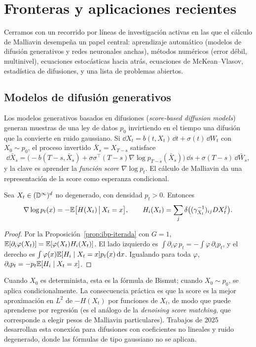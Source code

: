 \chapter{Fronteras y aplicaciones recientes}\label{cap:fronteras}

\begin{panorama}
Cerramos con un recorrido por líneas de investigación activas en las que el cálculo de
Malliavin desempeña un papel central: aprendizaje automático (modelos de difusión
generativos y redes neuronales anchas), métodos numéricos (error débil, multinivel), ecuaciones
estocásticas hacia atrás, ecuaciones de McKean--Vlasov, estadística de difusiones, y
una lista de problemas abiertos.
\end{panorama}

\section{Modelos de difusión generativos}
Los modelos generativos basados en difusiones (\emph{score-based diffusion models}) generan muestras
de una ley de datos $p_0$ invirtiendo en el tiempo una difusión que la convierte en ruido gaussiano.
Si $\dd X_t=b(t,X_t)\,\dd t+\sigma(t)\,\dd W_t$ con $X_0\sim p_0$, el proceso invertido $\bar X_s=X_{T-s}$ satisface
\[
  \dd\bar X_s=\big(-b(T-s,\bar X_s)+\sigma\sigma^\top(T-s)\nabla\log p_{T-s}(\bar X_s)\big)\,\dd s+\sigma(T-s)\,\dd\bar W_s,
\]
y la clave es aprender la \emph{función score} $\nabla\log p_t$. El cálculo de Malliavin da una representación
de la score como esperanza condicional.

\begin{proposicion}
Sea $X_t\in(\mathbb{D}^\infty)^d$ no degenerado, con
densidad $p_t>0$. Entonces
\[
  \nabla\log p_t(x)=-\mathbb{E}\big[H(X_t)\,\big|\,X_t=x\big],\qquad H_i(X_t)=\sum_j\delta\big((\gamma_{X_t}^{-1})_{ij}DX^j_t\big).
\]
\end{proposicion}

\begin{proof}
Por la Proposición~\ref{prop:ibp-iterada} con $G=1$, $\mathbb{E}[\partial_i\varphi(X_t)]=\mathbb{E}[\varphi(X_t)H_i(X_t)]$. El lado
izquierdo es $\int\partial_i\varphi\,p_t=-\int\varphi\,\partial_ip_t$, y el derecho es $\int\varphi(x)\mathbb{E}[H_i\mid X_t=x]p_t(x)\,\mathrm{d} x$. Igualando para
toda $\varphi$, $\partial_ip_t=-p_t\mathbb{E}[H_i\mid X_t=x]$.
\end{proof}

Cuando $X_0$ es determinista, esta es la fórmula de Bismut; cuando $X_0\sim p_0$, se aplica
condicionalmente. La consecuencia práctica es que la score es la mejor aproximación en $L^2$ de
$-H(X_t)$ por funciones de $X_t$, de modo que puede aprenderse por regresión (es el análogo de la
\emph{denoising score matching}, que corresponde a elegir pesos de Malliavin particulares). Trabajos de
2025 desarrollan esta conexión para difusiones con coeficientes no lineales y ruido degenerado,
donde las fórmulas de tipo gaussiano no se aplican.

